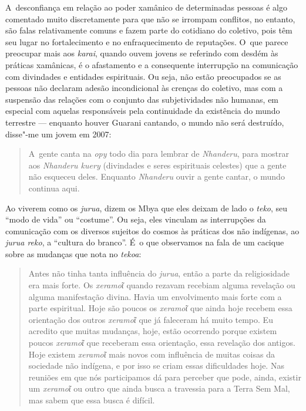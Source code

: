 A~desconfiança em relação ao poder xamânico de determinadas pessoas é
algo comentado muito discretamente para que não se irrompam conflitos,
no entanto, são falas relativamente comuns e fazem parte do cotidiano
do coletivo, pois têm seu lugar no fortalecimento e no enfraquecimento
de reputações. O~que parece preocupar mais aos \emph{karai}, quando ouvem
jovens se referindo com desdém às práticas xamânicas, é o afastamento e
a consequente interrupção na comunicação com divindades e entidades
espirituais. Ou seja, não estão preocupados se as pessoas não declaram
adesão incondicional às crenças do coletivo, mas com a suspensão das
relações com o conjunto das subjetividades não humanas, em especial com
aquelas responsáveis pela continuidade da existência do mundo terrestre
--- enquanto houver Guarani cantando, o mundo não será destruído,
disse"-me um jovem em 2007: 

\begin{quote}
A~gente canta na \emph{opy} todo dia para lembrar de \emph{Nhanderu}, para mostrar aos
\emph{Nhanderu kuery} (divindades e seres espirituais celestes) que a gente
não esqueceu deles. Enquanto \emph{Nhanderu} ouvir a gente cantar, o mundo
continua aqui.
\end{quote}

Ao viverem como os \emph{jurua}, dizem os Mbya que eles deixam de lado o \emph{teko},
seu ``modo de vida'' ou ``costume''. Ou seja, eles vinculam as interrupções
da comunicação com os diversos sujeitos do cosmos às práticas dos não
indígenas, ao \emph{jurua reko}, a ``cultura do branco''. É~o que observamos na
fala de um cacique sobre as mudanças que nota no \emph{tekoa}:

\begin{quote}
Antes não tinha tanta influência do \emph{jurua}, então a parte da
religiosidade era mais forte. Os \emph{xeramoῖ} quando rezavam recebiam
alguma revelação ou alguma manifestação divina. Havia um envolvimento
mais forte com a parte espiritual. Hoje são poucos os \emph{xeramoῖ} que
ainda hoje recebem essa orientação dos outros \emph{xeramoῖ} que já
faleceram há muito tempo. Eu acredito que muitas mudanças, hoje, estão
ocorrendo porque existem poucos \emph{xeramoῖ} que receberam essa
orientação, essa revelação dos antigos. Hoje existem \emph{xeramoῖ} mais
novos com influência de muitas coisas da sociedade não indígena, e por
isso se criam essas dificuldades hoje. Nas reuniões em que nós participamos
dá para perceber que pode, ainda, existir um \emph{xeramoῖ} ou outro que
ainda busca a travessia para a Terra Sem Mal, mas sabem que essa busca é
difícil.
\end{quote}

